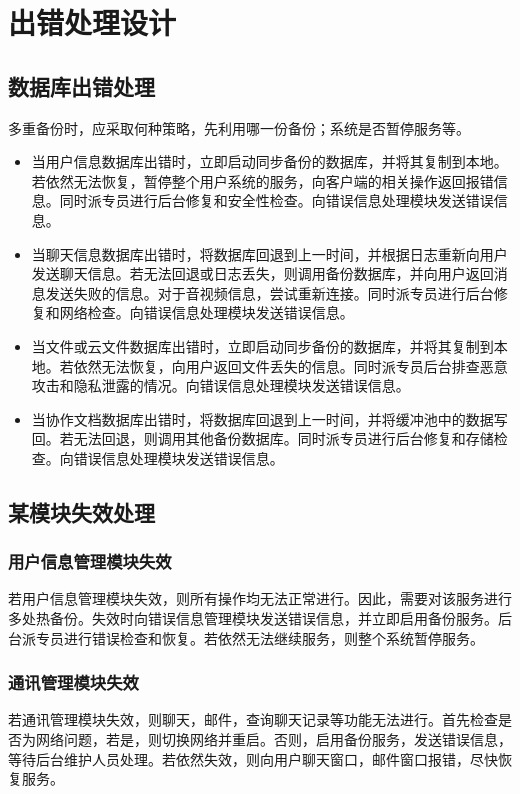 \chapter{出错处理设计}
\section{数据库出错处理}
多重备份时，应采取何种策略，先利用哪一份备份；系统是否暂停服务等。

\begin{itemize}
    \item 当用户信息数据库出错时，立即启动同步备份的数据库，并将其复制到本地。若依然无法恢复，暂停整个用户系统的服务，向客户端的相关操作返回报错信息。同时派专员进行后台修复和安全性检查。向错误信息处理模块发送错误信息。
    \item  当聊天信息数据库出错时，将数据库回退到上一时间，并根据日志重新向用户发送聊天信息。若无法回退或日志丢失，则调用备份数据库，并向用户返回消息发送失败的信息。对于音视频信息，尝试重新连接。同时派专员进行后台修复和网络检查。向错误信息处理模块发送错误信息。
    \item 当文件或云文件数据库出错时，立即启动同步备份的数据库，并将其复制到本地。若依然无法恢复，向用户返回文件丢失的信息。同时派专员后台排查恶意攻击和隐私泄露的情况。向错误信息处理模块发送错误信息。
    \item 当协作文档数据库出错时，将数据库回退到上一时间，并将缓冲池中的数据写回。若无法回退，则调用其他备份数据库。同时派专员进行后台修复和存储检查。向错误信息处理模块发送错误信息。

\end{itemize}


\section{某模块失效处理}
\subsection{用户信息管理模块失效}
若用户信息管理模块失效，则所有操作均无法正常进行。因此，需要对该服务进行多处热备份。失效时向错误信息管理模块发送错误信息，并立即启用备份服务。后台派专员进行错误检查和恢复。若依然无法继续服务，则整个系统暂停服务。
\subsection{通讯管理模块失效}
若通讯管理模块失效，则聊天，邮件，查询聊天记录等功能无法进行。首先检查是否为网络问题，若是，则切换网络并重启。否则，启用备份服务，发送错误信息，等待后台维护人员处理。若依然失效，则向用户聊天窗口，邮件窗口报错，尽快恢复服务。
